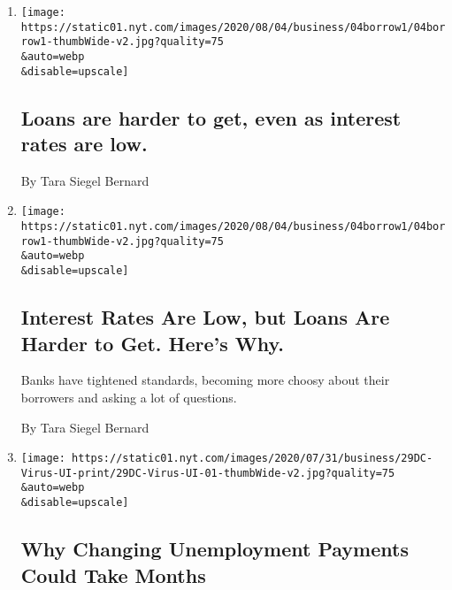 \begin{enumerate}
\def\labelenumi{\arabic{enumi}.}
\item
  \href{/live/2020/08/04/business/stock-market-today-coronavirus/loans-are-harder-to-get-even-as-interest-rates-are-low}{}

  \texttt{[image: https://static01.nyt.com/images/2020/08/04/business/04borrow1/04borrow1-thumbWide-v2.jpg?quality=75\\\&auto=webp\\\&disable=upscale]}

  \hypertarget{loans-are-harder-to-get-even-as-interest-rates-are-low}{%
  \subsection{Loans are harder to get, even as interest rates are
  low.}\label{loans-are-harder-to-get-even-as-interest-rates-are-low}}

  By Tara Siegel Bernard
\item
  \href{/2020/08/04/your-money/mortgage-loans-credit-cards-coronavirus.html}{}

  \texttt{[image: https://static01.nyt.com/images/2020/08/04/business/04borrow1/04borrow1-thumbWide-v2.jpg?quality=75\\\&auto=webp\\\&disable=upscale]}

  \hypertarget{interest-rates-are-low-but-loans-are-harder-to-get-heres-why}{%
  \subsection{Interest Rates Are Low, but Loans Are Harder to Get.
  Here's
  Why.}\label{interest-rates-are-low-but-loans-are-harder-to-get-heres-why}}

  Banks have tightened standards, becoming more choosy about their
  borrowers and asking a lot of questions.

  By Tara Siegel Bernard
\item
  \href{/2020/07/30/business/unemployment-payments-change.html}{}

  \texttt{[image: https://static01.nyt.com/images/2020/07/31/business/29DC-Virus-UI-print/29DC-Virus-UI-01-thumbWide-v2.jpg?quality=75\\\&auto=webp\\\&disable=upscale]}

  \hypertarget{why-changing-unemployment-payments-could-take-months}{%
  \subsection{Why Changing Unemployment Payments Could Take
  Months}\label{why-changing-unemployment-payments-could-take-months}}


\end{enumerate}

